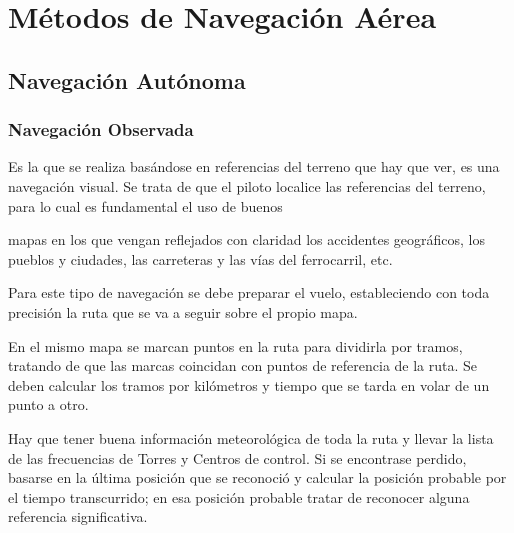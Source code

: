 \section{M\'etodos de Navegaci\'on A\'erea}

\subsection{Navegaci\'on Aut\'onoma}

\subsubsection{Navegaci\'on Observada \cite{Aena_SENASA_nav_aerea} }

 Es la que se realiza bas\'andose en
referencias del terreno que hay que ver, es una navegaci\'on visual.
Se trata de que el piloto localice las referencias del terreno, para lo
cual es fundamental el uso de buenos 
\begin{minipage}[b]{0.650\linewidth}
mapas en los que vengan
reflejados con claridad los accidentes geogr\'aficos, los pueblos y
ciudades, las carreteras y las v\'ias del ferrocarril, etc. \cite{Aena_SENASA_nav_aerea}

  Para este tipo de navegaci\'on se debe preparar el vuelo,
  estableciendo con toda precisi\'on la ruta que se va a seguir sobre
  el propio mapa.

  En el mismo mapa se marcan puntos en la ruta para dividirla por
  tramos, tratando de que las marcas coincidan con puntos de
  referencia de la ruta. Se deben calcular los tramos por kil\'ometros
  y tiempo que se tarda en volar de un punto a otro.

  Hay que tener buena informaci\'on meteorol\'ogica de toda la ruta y
  llevar la lista de las frecuencias de Torres y Centros de control.
  Si se encontrase perdido, basarse en la \'ultima posici\'on que se
  reconoci\'o y calcular la posici\'on probable por el tiempo
  transcurrido; en esa posici\'on probable tratar de reconocer alguna
  referencia significativa.

\end{minipage}

